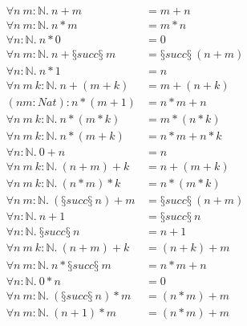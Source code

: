 \begin{conjectureset}[H]
\begin{align}
\forall n\ m : \mathbb{N}.\ n + m &= m + n \label{overlaprecursive:add_comm2}\\
\forall n\ m : \mathbb{N}.\ n * m &= m * n \label{overlaprecursive:mul_comm2}\\
\forall n : \mathbb{N}.\ n * 0 &= 0 \label{overlaprecursive:mul_zero2}\\
\forall n\ m : \mathbb{N}.\ n + §succ§\ m &= §succ§\ (n + m) \label{overlaprecursive:add_succ2}\\
\forall n : \mathbb{N}.\ n * 1 &= n \label{overlaprecursive:mul_one2}\\
\forall n\ m\ k : \mathbb{N}.\ n + (m + k) &= m + (n + k) \label{overlaprecursive:add_left_comm2}\\
(n m : Nat) : n * (m + 1) &= n * m + n \label{overlaprecursive:mul_succ2}\\
\forall n\ m\ k : \mathbb{N}.\ n * (m * k) &= m * (n * k) \label{overlaprecursive:mul_left_comm2}\\
\forall n\ m\ k : \mathbb{N}.\ n * (m + k) &= n * m + n * k \label{overlaprecursive:left_distrib2}\\
\forall n : \mathbb{N}.\ 0 + n &= n \label{overlaprecursive:zero_add2}\\
\forall n\ m\ k : \mathbb{N}.\ (n + m) + k &= n + (m + k) \label{overlaprecursive:add_assoc2}\\
\forall n\ m\ k : \mathbb{N}.\ (n * m) * k &= n * (m * k) \label{overlaprecursive:mul_assoc2}\\
\forall n\ m : \mathbb{N}.\ (§succ§\ n) + m &= §succ§\ (n + m) \label{overlaprecursive:false_negative1}\\
\forall n : \mathbb{N}.\ n + 1 &= §succ§\ n \label{overlaprecursive:false_negative2}\\
\forall n : \mathbb{N}.\ §succ§\ n &= n + 1 \label{overlaprecursive:false_negative3}\\
\forall n\ m\ k : \mathbb{N}.\ (n + m) + k &= (n + k) + m \label{overlaprecursive:false_negative4}\\
\forall n\ m : \mathbb{N}.\ n * §succ§\ m &= n * m + n \label{overlaprecursive:false_negative5}\\
\forall n : \mathbb{N}.\ 0 * n &= 0 \label{overlaprecursive:false_negative6}\\
\forall n\ m : \mathbb{N}.\ (§succ§\ n) * m &= (n * m) + m \label{overlaprecursive:false_negative7}\\
\forall n\ m : \mathbb{N}.\ (n + 1) * m &= (n * m) + m \label{overlaprecursive:false_negative8}\\

\end{align}
\end{conjectureset}
